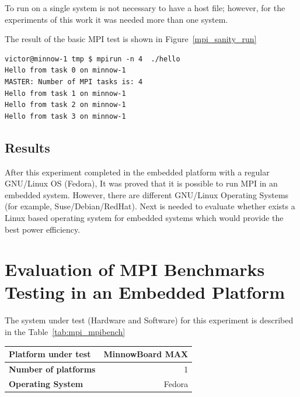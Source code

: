 To run on a single system is not necessary to have a host file; however, for
the experiments of this work it was needed more than one system.

The result of the basic MPI test is shown in Figure~\ref{mpi_sanity_run}

\begin{minipage}{\textwidth}
\end{minipage}

\begin{minipage}{\textwidth}
\begin{lstlisting}[frame=single]
victor@minnow-1 tmp $ mpirun -n 4  ./hello
Hello from task 0 on minnow-1
MASTER: Number of MPI tasks is: 4
Hello from task 1 on minnow-1
Hello from task 2 on minnow-1
Hello from task 3 on minnow-1
\end{lstlisting}
\label{mpi_sanity_run}
\end{minipage}

\subsection{Results}

After this experiment completed in the embedded platform with a regular GNU/Linux
OS (Fedora), It was proved that it is possible to run MPI in an embedded
system. However, there are different GNU/Linux Operating Systems
(for example, Suse/Debian/RedHat). Next is needed to evaluate whether exists a
Linux based operating system for embedded systems which would provide the best
power efficiency. 

\section{Evaluation of MPI Benchmarks Testing in an Embedded Platform}
    
The system under test (Hardware and Software) for this experiment is described
in the Table~\ref{tab:mpi_mpibench}

    \begin{center}
    \begin{tabular}{ | l | r |}
        \hline
        \textbf{Platform under test} &  MinnowBoard MAX \\ \hline
        \textbf{Number of platforms}  & 1  \\ \hline
        \textbf{Operating System} & Fedora  \\ \hline
    \end{tabular}
    \label{tab:mpi_mpibench}
    \end{center}

